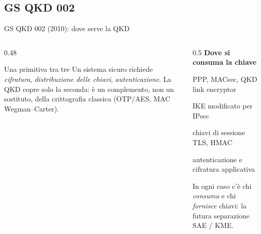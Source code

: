 \documentclass[10pt]{beamer}
\begin{document}
\subsection{GS QKD 002}

\begin{frame}{GS QKD 002 (2010): dove serve la QKD}
  \begin{columns}[T]
    \begin{column}{0.48\textwidth}
      \begin{block}{Una primitiva tra tre}
        Un sistema sicuro richiede \emph{cifratura}, \emph{distribuzione
        delle chiavi}, \emph{autenticazione}. La QKD copre \alert{solo la
        seconda}: è un complemento, non un sostituto, della crittografia
        classica (OTP/AES, MAC Wegman–Carter).
      \end{block}
    \end{column}
    \begin{column}{0.5\textwidth}
      \textbf{Dove si consuma la chiave}
      \begin{description}\small
        \item[L2] PPP, MACsec, QKD link encryptor
        \item[L3] IKE modificato per IPsec
        \item[L4] chiavi di sessione TLS, HMAC
        \item[L7] autenticazione e cifratura applicativa
      \end{description}
      \small In ogni caso c'è chi \emph{consuma} e chi \emph{fornisce}
      chiavi: la futura separazione \alert{SAE / KME}.
    \end{column}
  \end{columns}
\end{frame}
\end{document}
